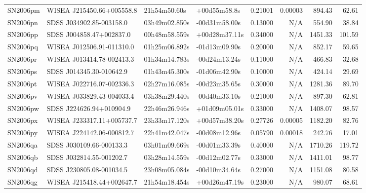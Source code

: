 \begin{longtable}{llllrrrr}
SN2006pm         &       WISEA J215450.66+005558.8 &    21h54m50.60s &    +00d55m58.8s &  0.21001 &  0.00003 &   894.43 &       62.61 \\
SN2006pn         &        SDSS J034902.85-003158.0 &   03h49m02.850s &   -00d31m58.00s &  0.13000 &      N/A &   554.90 &       38.84 \\
SN2006pp         &        SDSS J004858.47+002837.0 &   00h48m58.559s &   +00d28m37.11s &  0.34000 &      N/A &  1451.33 &      101.59 \\
SN2006pq         &       WISEA J012506.91-011310.0 &   01h25m06.892s &   -01d13m09.90s &  0.20000 &      N/A &   852.17 &       59.65 \\
SN2006pr         &       WISEA J013414.78-002413.3 &   01h34m14.783s &   -00d24m13.24s &  0.11000 &      N/A &   466.83 &       32.68 \\
SN2006ps         &        SDSS J014345.30-010642.9 &   01h43m45.300s &   -01d06m42.90s &  0.10000 &      N/A &   424.14 &       29.69 \\
SN2006pt         &       WISEA J022716.07-002336.3 &   02h27m16.085s &   -00d23m35.65s &  0.30000 &      N/A &  1281.36 &       89.70 \\
SN2006pv         &       WISEA J033829.43-004033.4 &   03h38m29.440s &   -00d40m33.10s &  0.21000 &      N/A &   897.30 &       62.81 \\
SN2006pw         &        SDSS J224626.94+010904.9 &   22h46m26.946s &   +01d09m05.01s &  0.33000 &      N/A &  1408.07 &       98.57 \\
SN2006px         &       WISEA J233317.11+005737.7 &   23h33m17.120s &   +00d57m38.20s &  0.27726 &  0.00005 &  1182.20 &       82.76 \\
SN2006py         &       WISEA J224142.06-000812.7 &   22h41m42.047s &   -00d08m12.96s &  0.05790 &  0.00018 &   242.76 &       17.01 \\
SN2006qa         &        SDSS J030109.66-000133.3 &   03h01m09.669s &   -00d01m33.39s &  0.40000 &      N/A &  1710.26 &      119.72 \\
SN2006qb         &        SDSS J032814.55-001202.7 &   03h28m14.559s &   -00d12m02.77s &  0.33000 &      N/A &  1411.01 &       98.77 \\
SN2006qd         &        SDSS J230805.08-001034.5 &   23h08m05.084s &   -00d10m34.64s &  0.27000 &      N/A &  1151.08 &       80.58 \\
SN2006qg         &       WISEA J215418.44+002647.7 &   21h54m18.454s &   +00d26m47.19s &  0.23000 &      N/A &   980.07 &       68.61 \\

\end{longtable}
